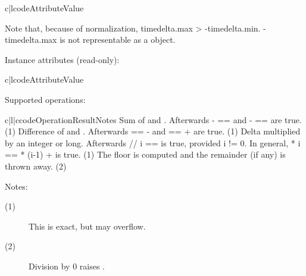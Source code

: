 \begin{tableii}{c|l}{code}{Attribute}{Value}
\end{tableii}

Note that, because of normalization, timedelta.max > -timedelta.min.
-timedelta.max is not representable as a  object.

Instance attributes (read-only):

\begin{tableii}{c|l}{code}{Attribute}{Value}
\end{tableii}

Supported operations:

\begin{tableiii}{c|l|c}{code}{Operation}{Result}{Notes}
          {Sum of  and . 
           Afterwards - ==  and -
           ==  are true.}
          {(1)}
          {Difference of  and . Afterwards  ==
            -  and  ==  +  are
           true.}
          {(1)}
          {Delta multiplied by an integer or long.
           Afterwards  // i ==  is true, provided i != 0.
           In general,  * i ==  * (i-1) +  is true.}
          {(1)}
          {The floor is computed and the remainder (if any) is thrown away.}
          {(2)}
\end{tableiii}
\noindent
Notes:

\begin{description}
\item[(1)]
This is exact, but may overflow.

\item[(2)]
Division by 0 raises .
\end{description}




